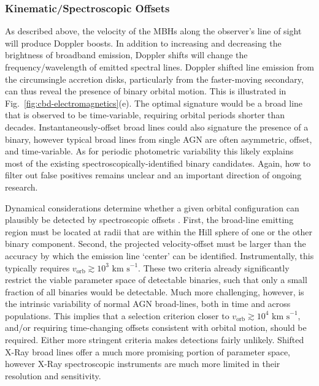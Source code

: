 \documentclass[onecolumn,authoryear]{els-mrw}
\begin{document}
\subsubsection{Kinematic/Spectroscopic Offsets}

As described above, the velocity of the MBHs along the observer's line of sight will produce Doppler boosts.  In addition to increasing and decreasing the brightness of broadband emission, Doppler shifts will change the frequency/wavelength of emitted spectral lines.  Doppler shifted line emission from the circumsingle accretion disks, particularly from the faster-moving secondary, can thus reveal the presence of binary orbital motion.  This is illustrated in Fig.~\ref{fig:cbd-electromagnetics}(e).  The optimal signature would be a broad line that is observed to be time-variable, requiring orbital periods shorter than decades.  Instantaneously-offset broad lines could also signature the presence of a binary, however typical broad lines from single AGN are often asymmetric, offset, and time-variable.  As for periodic photometric variability this likely explains most of the existing spectroscopically-identified binary candidates.  Again, how to filter out false positives remains unclear and an important direction of ongoing research.

Dynamical considerations determine whether a given orbital configuration can plausibly be detected by spectroscopic offsets \cite{Kelley+2021}.  First, the broad-line emitting region must be located at radii that are within the Hill sphere of one or the other binary component.  Second, the projected velocity-offset must be larger than the accuracy by which the emission line `center' can be identified.  Instrumentally, this typically requires $v_\textrm{orb} \gtrsim 10^3 \textrm{ km s}^{-1}$.  These two criteria already significantly restrict the viable parameter space of detectable binaries, such that only a small fraction of all binaries would be detectable.  Much more challenging, however, is the intrinsic variability of normal AGN broad-lines, both in time and across populations. This implies that a selection criterion closer to $v_\textrm{orb} \gtrsim 10^4 \textrm{ km s}^{-1}$, and/or requiring time-changing offsets consistent with orbital motion, should be required.  Either more stringent criteria makes detections fairly unlikely.  Shifted X-Ray broad lines offer a much more promising portion of parameter space, however X-Ray spectroscopic instruments are much more limited in their resolution and sensitivity.
\end{document}
